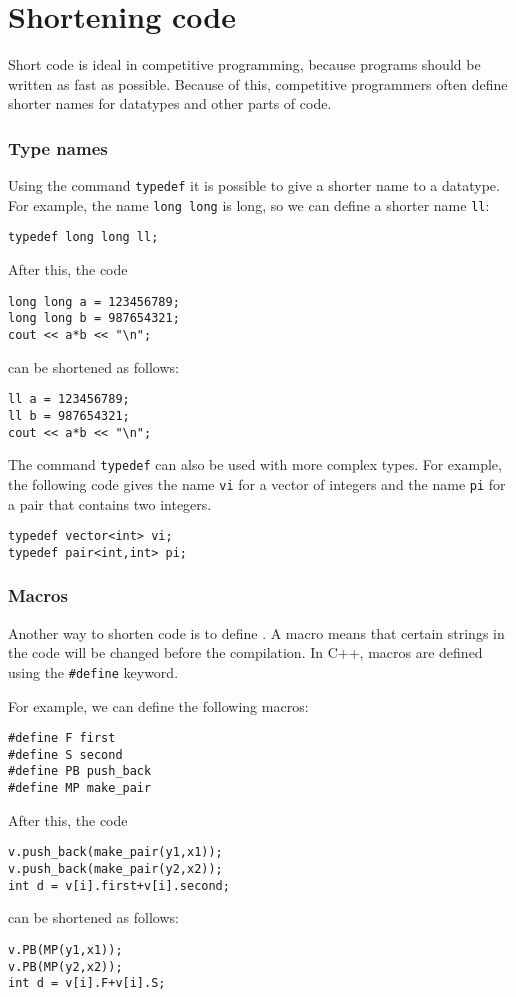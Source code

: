 \section{Shortening code}

Short code is ideal in competitive programming,
because programs should be written
as fast as possible.
Because of this, competitive programmers often define
shorter names for datatypes and other parts of code.

\subsubsection{Type names}
Using the command \texttt{typedef}
it is possible to give a shorter name
to a datatype.
For example, the name \texttt{long long} is long,
so we can define a shorter name \texttt{ll}:
\begin{lstlisting}
typedef long long ll;
\end{lstlisting}
After this, the code
\begin{lstlisting}
long long a = 123456789;
long long b = 987654321;
cout << a*b << "\n";
\end{lstlisting}
can be shortened as follows:
\begin{lstlisting}
ll a = 123456789;
ll b = 987654321;
cout << a*b << "\n";
\end{lstlisting}

The command \texttt{typedef}
can also be used with more complex types.
For example, the following code gives
the name \texttt{vi} for a vector of integers
and the name \texttt{pi} for a pair
that contains two integers.
\begin{lstlisting}
typedef vector<int> vi;
typedef pair<int,int> pi;
\end{lstlisting}

\subsubsection{Macros}
Another way to shorten code is to define
.
A macro means that certain strings in
the code will be changed before the compilation.
In C++, macros are defined using the
\texttt{\#define} keyword.

For example, we can define the following macros:
\begin{lstlisting}
#define F first
#define S second
#define PB push_back
#define MP make_pair
\end{lstlisting}
After this, the code
\begin{lstlisting}
v.push_back(make_pair(y1,x1));
v.push_back(make_pair(y2,x2));
int d = v[i].first+v[i].second;
\end{lstlisting}
can be shortened as follows:
\begin{lstlisting}
v.PB(MP(y1,x1));
v.PB(MP(y2,x2));
int d = v[i].F+v[i].S;
\end{lstlisting}

